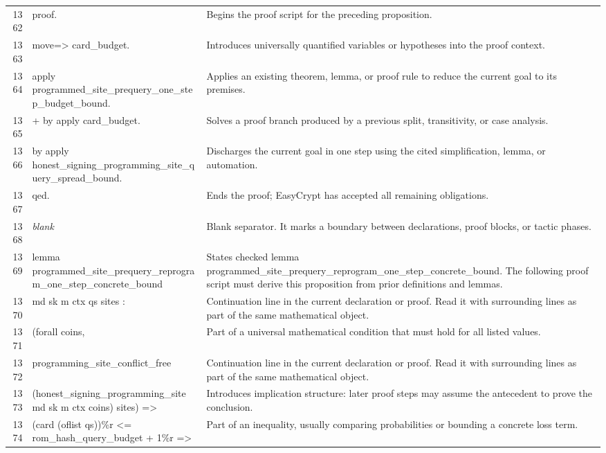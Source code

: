 \documentclass[10pt]{article}
\begin{document}
\begin{longtable}{r L{0.53\textwidth} L{0.37\textwidth}}
1362 & {\ttfamily\scriptsize proof.} & Begins the proof script for the preceding proposition. \\
1363 & {\ttfamily\scriptsize move=> card\_budget.} & Introduces universally quantified variables or hypotheses into the proof context. \\
1364 & {\ttfamily\scriptsize apply programmed\_site\_prequery\_one\_step\_budget\_bound.} & Applies an existing theorem, lemma, or proof rule to reduce the current goal to its premises. \\
1365 & {\ttfamily\scriptsize + by apply card\_budget.} & Solves a proof branch produced by a previous split, transitivity, or case analysis. \\
1366 & {\ttfamily\scriptsize by apply honest\_signing\_programming\_site\_query\_spread\_bound.} & Discharges the current goal in one step using the cited simplification, lemma, or automation. \\
1367 & {\ttfamily\scriptsize qed.} & Ends the proof; EasyCrypt has accepted all remaining obligations. \\
1368 & {\ttfamily\scriptsize \emph{blank}} & Blank separator.  It marks a boundary between declarations, proof blocks, or tactic phases. \\
1369 & {\ttfamily\scriptsize lemma programmed\_site\_prequery\_reprogram\_one\_step\_concrete\_bound} & States checked lemma programmed\_site\_prequery\_reprogram\_one\_step\_concrete\_bound.  The following proof script must derive this proposition from prior definitions and lemmas. \\
1370 & {\ttfamily\scriptsize   md sk m ctx qs sites :} & Continuation line in the current declaration or proof.  Read it with surrounding lines as part of the same mathematical object. \\
1371 & {\ttfamily\scriptsize   (forall coins,} & Part of a universal mathematical condition that must hold for all listed values. \\
1372 & {\ttfamily\scriptsize     programming\_site\_conflict\_free} & Continuation line in the current declaration or proof.  Read it with surrounding lines as part of the same mathematical object. \\
1373 & {\ttfamily\scriptsize       (honest\_signing\_programming\_site md sk m ctx coins) sites) =>} & Introduces implication structure: later proof steps may assume the antecedent to prove the conclusion. \\
1374 & {\ttfamily\scriptsize   (card (oflist qs))\%r <= rom\_hash\_query\_budget + 1\%r =>} & Part of an inequality, usually comparing probabilities or bounding a concrete loss term. \\

\end{longtable}
\end{document}

